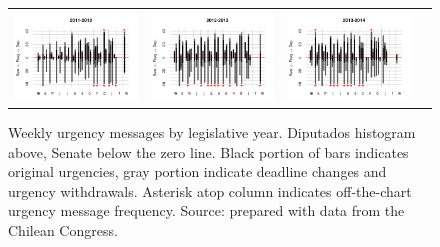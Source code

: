 \documentclass[letter,12pt]{article}
\begin{document}
\begin{figure}
\begin{center}
\begin{tabular}{cccc}
    \includegraphics[width=.22\columnwidth]{../graphs/urgenciasHistog2011.pdf} &
    \includegraphics[width=.22\columnwidth]{../graphs/urgenciasHistog2012.pdf} &
    \includegraphics[width=.22\columnwidth]{../graphs/urgenciasHistog2013.pdf} \\
\end{tabular}
  \caption{Weekly urgency messages by legislative year. Diputados histogram above, Senate below the zero line. Black portion of bars indicates original urgencies, gray portion indicate deadline changes and urgency withdrawals. Asterisk atop column indicates off-the-chart urgency message frequency. Source: prepared with data from the Chilean Congress.}\label{f:depvarHistog}
\end{center}
\end{figure}

\end{document}
